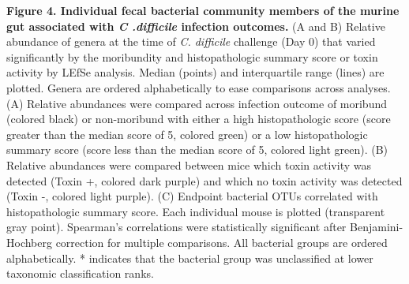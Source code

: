 \documentclass[
  12pt,
]{article}
\begin{document}
\textbf{Figure 4. Individual fecal bacterial community members of the
murine gut associated with \emph{C .difficile} infection outcomes.} (A
and B) Relative abundance of genera at the time of \emph{C. difficile}
challenge (Day 0) that varied significantly by the moribundity and
histopathologic summary score or toxin activity by LEfSe analysis.
Median (points) and interquartile range (lines) are plotted. Genera are
ordered alphabetically to ease comparisons across analyses. (A) Relative
abundances were compared across infection outcome of moribund (colored
black) or non-moribund with either a high histopathologic score (score
greater than the median score of 5, colored green) or a low
histopathologic summary score (score less than the median score of 5,
colored light green). (B) Relative abundances were compared between mice
which toxin activity was detected (Toxin +, colored dark purple) and
which no toxin activity was detected (Toxin -, colored light purple).
(C) Endpoint bacterial OTUs correlated with histopathologic summary
score. Each individual mouse is plotted (transparent gray point).
Spearman's correlations were statistically significant after
Benjamini-Hochberg correction for multiple comparisons. All bacterial
groups are ordered alphabetically. * indicates that the bacterial group
was unclassified at lower taxonomic classification ranks.

\hfill\break
\end{document}
